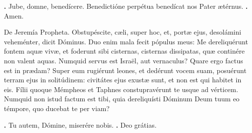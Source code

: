 \begin{small}
\textbf{\Vbar.} Jube, domne, benedícere.
 \hspace{.3em}
Benedictióne perpétua benedícat nos Pater ætérnus. \textbf{\Rbar.} Amen.
\end{small}


De Jeremía Propheta. 
Obstupéscite, cæli, super hoc, et, portæ ejus, desolámini veheménter, dicit Dóminus.
Duo enim mala fecit pópulus meus: Me dereliquérunt fontem aquæ vivæ, et foderunt sibi cisternas, cisternas dissipatas, quæ continére non valent aquas.
Numquid servus est Israël, aut vernaculus? Quare ergo factus est in prædam?
Super eum rugiérunt leones, et dedérunt vocem suam, posuérunt terram ejus in solitúdinem: civitátes ejus exustæ sunt, et non est qui habitet in eis.
Fílii quoque Mémpheos et Taphnes constupravérunt te usque ad vérticem.
Numquid non istud factum est tibi, quia dereliquísti Dóminum Deum tuum eo témpore, quo ducebat te per viam?

\textbf{\Vbar.} Tu autem, Dómine, miserére nobis.
\textbf{\Rbar.} Deo grátias.


